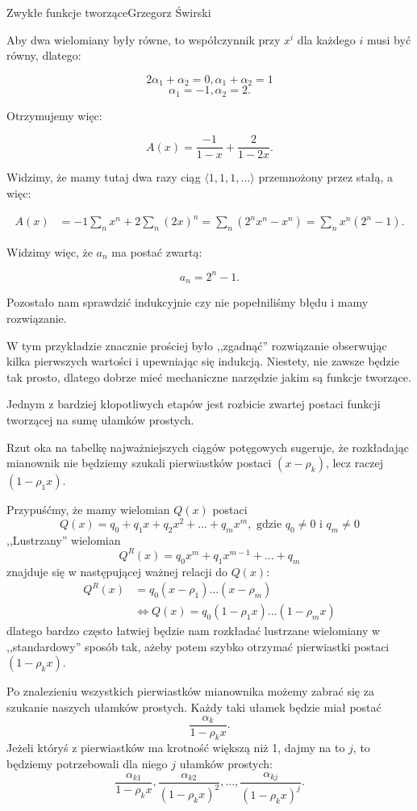 \begin{referat}{Zwykłe funkcje tworzące}{Grzegorz Świrski}
\begin{teoria}
Aby dwa wielomiany były równe, to współczynnik przy $x^i$ dla każdego $i$ musi
być równy, dlatego:

$$ 2 \alpha_1 + \alpha_2 = 0, \alpha_1+\alpha_2 = 1$$
$$ \alpha_1 = -1, \alpha_2 = 2.$$

Otrzymujemy więc:

$$ A(x) = \frac{-1}{1-x} + \frac{2}{1-2x}.$$

Widzimy, że mamy tutaj dwa razy ciąg $\langle 1,1,1,... \rangle$ przemnożony
przez stałą, a więc:

\begin{align*}
  A(x) &= -1 \sum_n x^n + 2 \sum_n (2x)^n = \sum_n (2^nx^n - x^n) = \sum_n x^n(2^n - 1).
\end{align*}

Widzimy więc, że $a_n$ ma postać zwartą:

$$ a_n = 2^n - 1.$$

Pozostało nam sprawdzić indukcyjnie czy nie popełniliśmy błędu i mamy rozwiązanie.

W tym przykładzie znacznie prościej było ,,zgadnąć'' rozwiązanie obserwując
kilka pierwszych wartości i upewniając się indukcją. Niestety, nie zawsze będzie tak
prosto, dlatego dobrze mieć mechaniczne narzędzie jakim są funkcje tworzące.

Jednym z bardziej kłopotliwych etapów jest rozbicie zwartej postaci funkcji
tworzącej na sumę ułamków prostych.

Rzut oka na tabelkę najważniejszych ciągów potęgowych sugeruje, że rozkładając
mianownik nie będziemy szukali pierwiastków postaci $(x-\rho_k)$, lecz raczej
$(1-\rho_1x)$.

Przypuśćmy, że mamy wielomian $Q(x)$ postaci
$$ Q(x) = q_0 + q_1x + q_2x^2 + ... + q_mx^m, 
\text{ gdzie } q_0 \not= 0 \text{ i } q_m \not= 0$$
,,Lustrzany'' wielomian
$$Q^R(x) = q_0x^m + q_1x^{m-1} + ... + q_m$$
znajduje się w następującej ważnej relacji do $Q(x)$:
\begin{align*}
  Q^R(x) &= q_0(x - \rho_1)...(x - \rho_m) \\
  &\Leftrightarrow Q(x) = q_0(1-\rho_1x)...(1-\rho_mx)
\end{align*}
dlatego bardzo często łatwiej będzie nam rozkładać lustrzane wielomiany
w ,,standardowy'' sposób tak, ażeby potem szybko otrzymać pierwiastki
postaci $(1-\rho_kx)$.

Po znalezieniu wszystkich pierwiastków mianownika możemy zabrać się za
szukanie naszych ułamków prostych. Każdy taki ułamek będzie miał postać
$$\frac{\alpha_k}{1-\rho_kx}.$$
Jeżeli któryś z pierwiastków ma krotność większą niż 1, dajmy na to $j$,
to będziemy potrzebowali dla niego $j$ ułamków prostych:
$$\frac{\alpha_{k1}}{1-\rho_kx}, \frac{\alpha_{k2}}{(1-\rho_kx)^2},
..., \frac{\alpha_{kj}}{(1-\rho_kx)^j}.$$


\end{teoria}
\end{referat}
